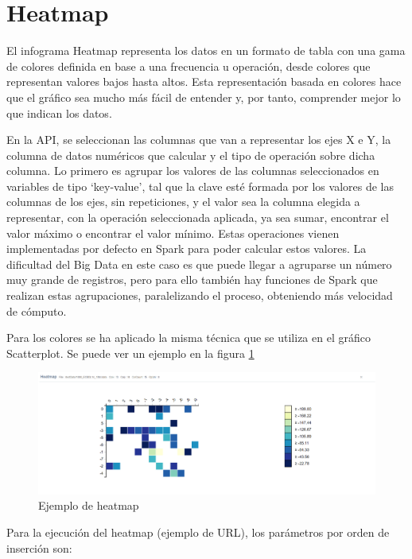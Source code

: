 
\section{Heatmap}
El infograma Heatmap representa los datos en un formato de tabla con una gama de colores definida en base a una frecuencia u operación, desde colores que representan valores bajos hasta altos. Esta representación basada en colores hace que el gráfico sea mucho más fácil de entender y, por tanto, comprender mejor lo que indican los datos.

En la API, se seleccionan las columnas que van a representar los ejes X e Y, la columna de datos numéricos que calcular y el tipo de operación sobre dicha columna. Lo primero es agrupar los valores de las columnas seleccionados en variables de tipo ‘key-value’, tal que la clave esté formada por los valores de las columnas de los ejes, sin repeticiones, y el valor sea la columna elegida a representar, con la operación seleccionada aplicada, ya sea sumar, encontrar el valor máximo o encontrar el valor mínimo. Estas operaciones vienen implementadas por defecto en Spark para poder calcular estos valores. La dificultad del Big Data en este caso es que puede llegar a agruparse un número muy grande de registros, pero para ello también hay funciones de Spark que realizan estas agrupaciones, paralelizando el proceso, obteniendo más velocidad de cómputo.

Para los colores se ha aplicado la misma técnica que se utiliza en el gráfico Scatterplot.  Se puede ver un ejemplo en la figura \ref{fig:ejemploheatmap}
\begin{figure}
	\centering
	\includegraphics[width=1\linewidth]{imagenes/ejemplo_heatmap}
	\caption{Ejemplo de heatmap}
	\label{fig:ejemploheatmap}
\end{figure}

Para la ejecución del heatmap (ejemplo de URL\footnotemark), los parámetros por orden de inserción son:

